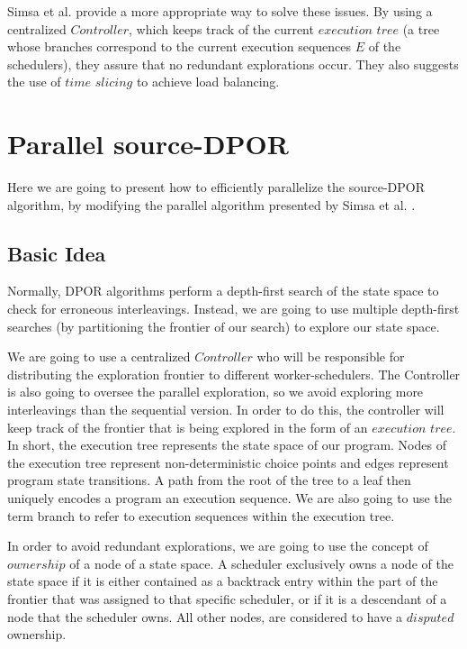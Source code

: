 Simsa et al. \cite{Simsa2012ScalableDP} provide
a more appropriate way to solve these issues. By using a centralized $Controller$, which keeps track of the current 
$execution$ $tree$ (a tree whose branches correspond to the current execution sequences $E$ of the schedulers), they assure that no redundant explorations occur. They also suggests the use of
$time$ $slicing$ to achieve load balancing.

\section{Parallel source-DPOR}

Here we are going to present how to efficiently parallelize the source-DPOR algorithm, by modifying the parallel algorithm 
presented by Simsa et al. \cite{Simsa2012ScalableDP}.

\subsection{Basic Idea}

Normally, DPOR algorithms perform a depth-first search of the state space to check for erroneous interleavings. Instead, we
are going to use multiple depth-first searches (by partitioning the frontier of our search) to explore our state space.

We are going to use a centralized $Controller$ who will be
responsible for distributing the exploration
frontier to different worker-schedulers. The Controller is
also going to oversee the parallel exploration, so we avoid exploring more interleavings than the sequential version. In order to do this, the controller will keep track of the frontier that is being explored in the form of an $execution$ $tree$. In short, the execution tree represents the state space of our program.
Nodes of the execution tree represent non-deterministic choice points and edges
represent program state transitions. A path from the root of the tree to a leaf then
uniquely encodes a program an execution sequence. We are also going to use the term branch to refer to execution sequences within the execution tree.

In order to avoid redundant explorations, we are going to use the
concept of $ownership$ \cite{Simsa2012ScalableDP} of a node of a state space. A scheduler exclusively owns a node of the state space if it is
either contained  as a backtrack entry within the part of the frontier that was assigned 
to that specific scheduler, or if it is a descendant of a node
that the scheduler owns. All other nodes, are considered to have a
$disputed$ ownership. 

